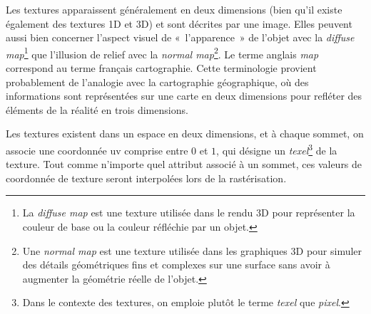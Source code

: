 Les textures apparaissent généralement en deux dimensions (bien qu'il existe également des textures 1D et 3D) et sont décrites par une image. Elles peuvent aussi bien concerner l'aspect visuel de «~l'apparence~» de l'objet avec la \textit{diffuse map}\footnote{La \textit{diffuse map} est une texture utilisée dans le rendu 3D pour représenter la couleur de base ou la couleur réfléchie par un objet.} que l'illusion de relief avec la \textit{normal map}\footnote{Une \textit{normal map} est une texture utilisée dans les graphiques 3D pour simuler des détails géométriques fins et complexes sur une surface sans avoir à augmenter la géométrie réelle de l'objet.}. Le terme anglais \textit{map} correspond au terme français cartographie. Cette terminologie provient probablement de l'analogie avec la cartographie géographique, où des informations sont représentées sur une carte en deux dimensions pour refléter des éléments de la réalité en trois dimensions.

Les textures existent dans un espace en deux dimensions, et à chaque sommet, on associe une coordonnée uv comprise entre $0$ et $1$, qui désigne un \textit{texel}\footnote{Dans le contexte des textures, on emploie plutôt le terme \textit{texel} que \textit{pixel}.} de la texture. Tout comme n'importe quel attribut associé à un sommet, ces valeurs de coordonnée de texture seront interpolées lors de la rastérisation.



